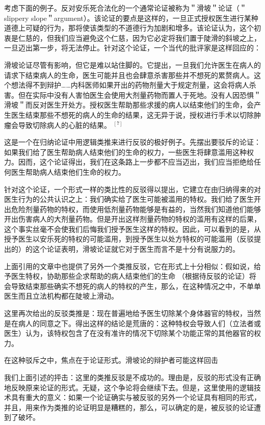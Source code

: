 考虑下面的例子。反对安乐死合法化的一个通常论证被称为＂滑坡＂论证（＂slippery slope＂argument）。该论证的要点是这样的，一旦正式授权医生进行某种道德上可疑的行为，那将使该类型的不道德行为加剧和增多。该论证认为，这个初衷是仁慈的，但我们应当避免这个仁慈，因为它必定将我们置于陡滑的斜坡之上，一旦迈出第一步，将无法停止。针对这个论证，一个当代的批评家是这样回应的：

滑坡论证尽管有影响，但它是难以站住脚的。它提出，一旦我们允许医生在病人的请求下结束病人的生命，医生可能并且也会肆意杀害那些并不想死的累赘病人。这个想法得不到辩护……内科医师如果开出的药物剂量大于规定剂量，这会将病人杀害。但在实际中没有人害怕医生会使用大剂量药物而置人于死地。没有人因恐惧＂滑坡＂而反对医生开处方。授权医生帮助那些求援的病人以结束他们的生命，会产生医生结束那些不想死的病人的生命的结果，这无异于说，授权进行手术以切除肿瘤会导致切除病人的心脏的结果。 ${ }^{[7]}$

这是一个在归纳论证中用逻辑类推来进行反驳的极好例子。先摆出要驳斥的论证：如果我们给了医生帮助病人结束他们的生命的权力，一些医生将肆意滥用这种权力。因而，这个论证得出，我们在这条路上一步都不应当迈出，我们应当拒绝给任何医生帮助病人结束他们生命的权力。

针对这个论证，一个形式一样的类比性的反驳得以提出，它建立在由归纳得来的对医生行为的公共认识之上：我们确实给了医生可能被滥用的特权。我们给了医生开出危险剂量药物的特权，而使用低剂量药物能够是有益的，当然我们知道他们能够开出伤害病人的大剂量药物。但是开出这样剂量药物的特权的滥用有这样的后果，这个事实丝毫不会使我们后悔我们授予医生这样的特权。因此，可以看到的是，从授予医生以安乐死的特权的可能滥用，到授予医生以处方特权的可能滥用（反驳提出的）的这个论证表明，滑坡论证就它对于医生而言不是十分有说服力的。

上面引用的文章中也提供了另外一个类推反驳，它在形式上十分相似：假如说，给予医生特权，协助那些企求帮助的病人结束他们的生命 （根据待反驳的论证）将会导致结束那些确实不想死的病人的特权的产生，那么，在这种情况之中，不单单医生而且立法机构都在陡坡上滑动。

这里再次给出的反驳类推是：现在普遍地给予医生切除某个身体器官的特权，当然是在病人的同意之下。得出这样的结论是荒唐的：这种特权会导致人们（立法者或医生）认为，该特权包含了在没有准许的情况下切除某个功能正常的其他器官的权力。

在这种驳斥之中，焦点在于论证形式。滑坡论的辩护者可能这样回击

我们上面引述的抨击：这里的类推反驳是不成功的。理由是，反驳的形式没有正确地反映原来论证的形式。无疑，这个争论将会继续下去。但是，这里使用的逻辑技术具有重大的意义：如果一个论证确实与被反驳的另外一个论证具有相同的形式，并且，用来作为类推的论证明显是糟糕的，那么，可以确定的是，被反驳的论证遭到了破坏。

